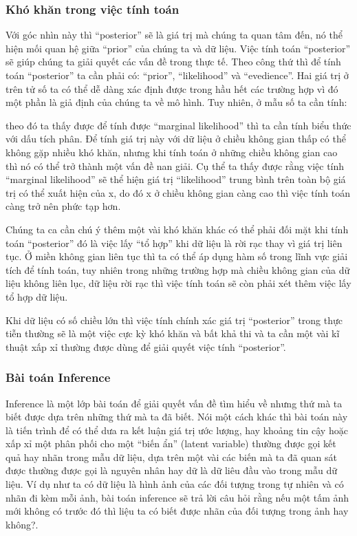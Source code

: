         \subsubsection{Khó khăn trong việc tính toán}
        Với góc nhìn này thì ``posterior'' sẽ là giá trị mà chúng ta quan tâm đến, nó thể hiện mối quan hệ giữa ``prior'' của chúng ta và dữ liệu. 
        Việc tính toán ``posterior'' sẽ giúp chúng ta giải quyết các vấn đề trong thực tế.
        Theo công thứ thì để tính toán ``posterior'' ta cần phải có: ``prior'', ``likelihood'' và ``evedience''. Hai giá trị ở trên tử số ta có thể dễ dàng xác định được trong hầu hết các trường hợp vì đó một phần là giả định của chúng ta về mô hình. Tuy nhiên, ở mẫu số ta cần tính:

        theo đó ta thấy được để tính được ``marginal likelihood'' thì ta cần tính biểu thức với dấu tích phân. Để tính giá trị này với dữ liệu ở chiều không gian thấp có thể không gặp nhiều khó khăn, nhưng khi tính toán ở những chiều không gian cao thì nó có thể trở thành một vấn đề nan giải. 
        Cụ thể ta thấy được rằng việc tính ``marginal likelihood'' sẽ thể hiện giá trị ``likelihood'' trung bình trên toàn bộ giá trị có thể xuất hiện của x, do đó x ở chiều không gian càng cao thì việc tính toán càng trở nên phức tạp hơn. 

        Chúng ta ca cần chú ý thêm một vài khó khăn khác có thể phải đối mặt khi tính toán ``posterior'' đó là việc lấy ``tổ hợp'' khi dữ liệu là rời rạc thay vì giá trị liên tục. 
        Ở miền không gian liên tục thì ta có thể áp dụng hàm số trong lĩnh vực giải tích để tính toán, tuy nhiên trong những trường hợp mà chiều không gian của dữ liệu không liên lục, dữ liệu rời rạc thì việc tính toán sẽ còn phải xét thêm việc lấy tổ hợp dữ liệu. 

        Khi dữ liệu có số chiều lớn thì việc tính chính xác giá trị ``posterior'' trong thực tiễn thường sẽ là một việc cực kỳ khó khăn và bất khả thi và ta cần một vài kĩ thuật xấp xỉ thường được dùng để giải quyết việc tính ``posterior''. 

        \subsubsection{Bài toán Inference}
        Inference là một lớp bài toán để giải quyết vấn đề tìm hiểu về nhưng thứ mà ta biết được dựa trên những thứ mà ta đã biết. Nói một cách khác thì bài toán này là tiến trình để có thể dưa ra kết luận giá trị ước lượng, hay khoảng tin cậy hoặc xấp xỉ một phân phối cho một ``biến ẩn'' (latent variable) thường được gọi kết quả hay nhãn  trong mẫu dữ liệu, dựa trên một vài các biến mà ta đã quan sát được thường được gọi là nguyên nhân hay dữ là dữ liêu đầu vào trong mẫu dữ liệu. Ví dụ như ta có dữ liệu là hình ảnh của các đối tượng trong tự nhiên và có nhãn đi kèm mỗi ảnh, bài toán inference sẽ trả lời câu hỏi rằng nếu một tấm ảnh mới không có trước đó thì liệu ta có biết được nhãn của đối tượng trong ảnh hay không?. 

